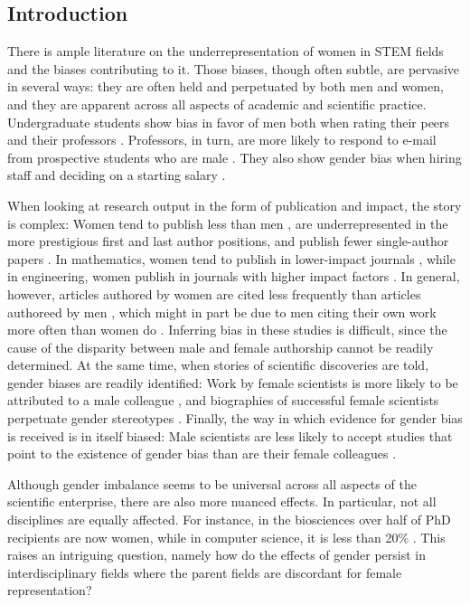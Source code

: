 \documentclass[10pt,letterpaper]{article}
\begin{document}
\begin{flushleft}
\section*{Introduction}
There is ample literature on the underrepresentation of women in STEM fields and the biases contributing to it. Those biases, though often subtle, are pervasive in several ways: they are often held and perpetuated by both men and women, and they are apparent across all aspects of academic and scientific practice. Undergraduate students show bias in favor of men both when rating their peers\cite{Grunspan2016} and their professors \cite{MacNell2014}. Professors, in turn, are more likely to respond to e-mail from prospective students who are male \cite{Milkman2015}. They also show gender bias when hiring staff and deciding on a starting salary \cite{Moss-Racusin2012}.

When looking at research output in the form of publication and impact, the story is complex: Women tend to publish less than men \cite{Lariviere2013}, are underrepresented in the more prestigious first and last author positions, and publish fewer single-author papers \cite{West2013}. In mathematics, women tend to publish in lower-impact journals \cite{Mihaljevic-Brandt2016}, while in engineering, women publish in journals with higher impact factors \cite{Ghiasi2015}. In general, however, articles authored by women are cited less frequently than articles authoreed by men \cite{Lariviere2013,Ghiasi2015}, which might in part be due to men citing their own work more often than women do \cite{King2016}. Inferring bias in these studies is difficult, since the cause of the disparity between male and female authorship cannot be readily determined. At the same time, when stories of scientific discoveries are told, gender biases are readily identified: Work by female scientists is more likely to be attributed to a male colleague \cite{Rossiter1993}, and biographies of successful female scientists perpetuate gender stereotypes \cite{Fara2013}. Finally, the way in which evidence for gender bias is received is in itself biased:  Male scientists are less likely to accept studies that point to the existence of gender bias than are their female colleagues \cite{Handley2015}.

Although gender imbalance seems to be universal across all aspects of the scientific enterprise, there are also more nuanced effects. In particular, not all disciplines are equally affected. For instance, in the biosciences over half of PhD recipients are now women, while in computer science, it is less than 20\% \cite{NSF2015}. This raises an intriguing question, namely how do the effects of gender persist in interdisciplinary fields where the parent fields are discordant for female representation?


\end{flushleft}
\end{document}
